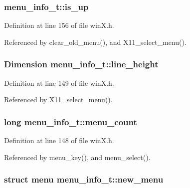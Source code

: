 \hypertarget{structmenu__info__t_add9292ec792c147f95126c726d42f6c9}{
\subsubsection[{is\+\_\+up}]{ menu\+\_\+info\+\_\+t\+::is\+\_\+up}}\label{structmenu__info__t_add9292ec792c147f95126c726d42f6c9}


Definition at line 156 of file win\+X.\+h.



Referenced by clear\+\_\+old\+\_\+menu(), and X11\+\_\+select\+\_\+menu().

\hypertarget{structmenu__info__t_a370a43d822791dc3562033b47299fb8e}{
\subsubsection[{line\+\_\+height}]{\setlength{\rightskip}{0pt plus 5cm}Dimension menu\+\_\+info\+\_\+t\+::line\+\_\+height}}\label{structmenu__info__t_a370a43d822791dc3562033b47299fb8e}


Definition at line 149 of file win\+X.\+h.



Referenced by X11\+\_\+select\+\_\+menu().

\hypertarget{structmenu__info__t_ab05c75ece223e9b781e3031dfecefa49}{
\subsubsection[{menu\+\_\+count}]{\setlength{\rightskip}{0pt plus 5cm}long menu\+\_\+info\+\_\+t\+::menu\+\_\+count}}\label{structmenu__info__t_ab05c75ece223e9b781e3031dfecefa49}


Definition at line 148 of file win\+X.\+h.



Referenced by menu\+\_\+key(), and menu\+\_\+select().

\hypertarget{structmenu__info__t_a9f0590d4ac57838754e95bbfd20c702d}{
\subsubsection[{new\+\_\+menu}]{\setlength{\rightskip}{0pt plus 5cm}struct {\bf menu} menu\+\_\+info\+\_\+t\+::new\+\_\+menu}}\label{structmenu__info__t_a9f0590d4ac57838754e95bbfd20c702d}


